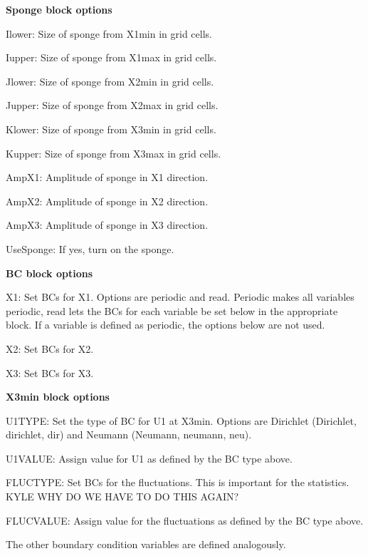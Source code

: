 \textbf{Sponge block options}
\begin{description}
  \item Ilower: Size of sponge from X1min in grid cells.
  \item Iupper: Size of sponge from X1max in grid cells.
  \item Jlower: Size of sponge from X2min in grid cells.
  \item Jupper: Size of sponge from X2max in grid cells.
  \item Klower: Size of sponge from X3min in grid cells.
  \item Kupper: Size of sponge from X3max in grid cells.
  \item AmpX1: Amplitude of sponge in X1 direction.
  \item AmpX2: Amplitude of sponge in X2 direction.
  \item AmpX3: Amplitude of sponge in X3 direction.
  \item UseSponge: If yes, turn on the sponge.
\end{description}

\textbf{BC block options}
\begin{description}
  \item X1: Set BCs for X1. Options are periodic and read. Periodic makes all
            variables periodic, read lets the BCs for each variable be set 
            below in the appropriate block. If a variable is defined as 
            periodic, the options below are not used.
  \item X2: Set BCs for X2.
  \item X3: Set BCs for X3.
\end{description}

\textbf{X3min block options}
\begin{description}
  \item U1TYPE: Set the type of BC for U1 at X3min. Options are Dirichlet
       (Dirichlet, dirichlet, dir)  and Neumann (Neumann, neumann, neu).
  \item U1VALUE: Assign value for U1 as defined by the BC type above.
  \item FLUCTYPE: Set BCs for the fluctuations. This is important for the 
        statistics. KYLE WHY DO WE HAVE TO DO THIS AGAIN?
  \item FLUCVALUE: Assign value for the fluctuations as defined by the BC type
                   above. 
\end{description}
The other boundary condition variables are defined analogously. 

